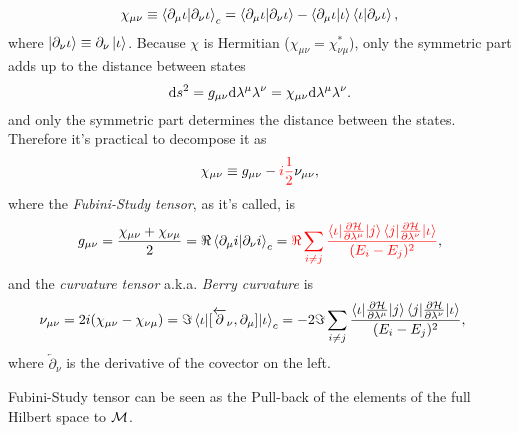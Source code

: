 \begin{equation}
    \chi_{\mu\nu}\equiv \braket{\partial_\mu \iota|\partial_\nu \iota}_c = \braket{\partial_\mu \iota|\partial_\nu \iota} - \braket{\partial_\mu \iota|\iota}\braket{\iota|\partial_\nu \iota},
\end{equation}
where $\ket{\partial_\nu \iota}\equiv\partial_\nu \ket{ \iota}$. Because $\chi$ is Hermitian ($\chi_{\mu\nu}=\chi^*_{\nu\mu}$), only the symmetric part adds up to the distance between states 
\begin{equation}
    \mathrm{d} s^2= g_{\mu\nu}\mathrm{d} \lambda^\mu \lambda^\nu= \chi_{\mu\nu}\mathrm{d} \lambda^\mu \lambda^\nu.
\end{equation}
 and only the symmetric part determines the distance between the states. Therefore it's practical to decompose it as
\begin{equation}
    \chi_{\mu\nu} \equiv g_{\mu\nu} - \textcolor{red}{i\frac{1}{2}} \nu_{\mu\nu},
\end{equation}
where the \emph{Fubini-Study tensor}, as it's called, is
\begin{equation}
    g_{\mu\nu} = \frac{\chi_{\mu\nu}+\chi_{\nu\mu}}{2} = \Re\braket{\partial_\mu i|\partial_\nu i}_c = \textcolor{red}{\Re \sum_{i\neq j}\frac{\braket{\iota|\frac{\partial \mathcal{H}}{\partial \lambda^\mu}|j}\braket{j|\frac{\partial \mathcal{H}}{\partial \lambda^\nu}|\iota}}{(E_i-E_j)^2}},
    \label{eq:geom.tensorREdefinition}
\end{equation}
and the \emph{curvature tensor} a.k.a. \emph{Berry curvature} is
\begin{equation}
    \begin{split}
        \nu_{\mu\nu} = 2 i(\chi_{\mu\nu}-\chi_{\nu\mu})&= \Im\braket{\iota|[\overleftarrow{\partial}_\nu,\partial_\mu]|\iota}_c = -2 \Im \sum_{i\neq j}\frac{\braket{\iota|\frac{\partial \mathcal{H}}{\partial \lambda^\mu}|j}\braket{j|\frac{\partial \mathcal{H}}{\partial \lambda^\nu}|\iota}}{(E_i-E_j)^2},
    \end{split}
\end{equation}
where $\overleftarrow{\partial}_\nu$ is the derivative of the covector on the left.

Fubini-Study tensor can be seen as the Pull-back of the elements of the full Hilbert space to $\mathcal{M}$. 


